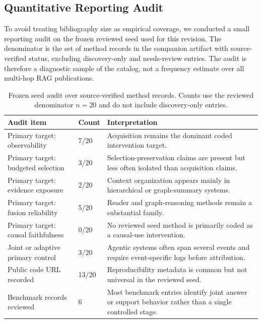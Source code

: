 \documentclass[manuscript,review]{acmart}
\theoremstyle{definition}
\theoremstyle{plain}
\theoremstyle{remark}
\begin{document}
\subsection{Quantitative Reporting Audit}
\label{subsec:quantitative_audit}

To avoid treating bibliography size as empirical coverage, we conducted a
small reporting audit on the frozen reviewed seed used for this revision. The
denominator is the set of method records in the companion artifact with
source-verified status, excluding discovery-only and needs-review entries.
The audit is therefore a diagnostic sample of the catalog, not a frequency
estimate over all multi-hop RAG publications.

\begin{table}[t]
\caption{Frozen seed audit over source-verified method records. Counts use
the reviewed denominator $n=20$ and do not include discovery-only entries.}
\label{tab:reviewed_seed_audit}
\centering
\scriptsize
\begin{tabularx}{\linewidth}{@{}p{3.1cm}p{2.0cm}Y@{}}
\toprule
Audit item & Count & Interpretation \\
\midrule
Primary target: observability & 7/20 & Acquisition remains the dominant
coded intervention target. \\
Primary target: budgeted selection & 3/20 & Selection-preservation claims
are present but less often isolated than acquisition claims. \\
Primary target: evidence exposure & 2/20 & Context organization appears
mainly in hierarchical or graph-summary systems. \\
Primary target: fusion reliability & 5/20 & Reader and graph-reasoning
methods remain a substantial family. \\
Primary target: causal faithfulness & 0/20 & No reviewed seed method is
primarily coded as a causal-use intervention. \\
Joint or adaptive primary control & 3/20 & Agentic systems often span
several events and require event-specific logs before attribution. \\
Public code URL recorded & 13/20 & Reproducibility metadata is common but
not universal in the reviewed seed. \\
Benchmark records reviewed & 6 & Most benchmark entries identify joint
answer or support behavior rather than a single controlled stage. \\
\bottomrule
\end{tabularx}
\end{table}
\end{document}
